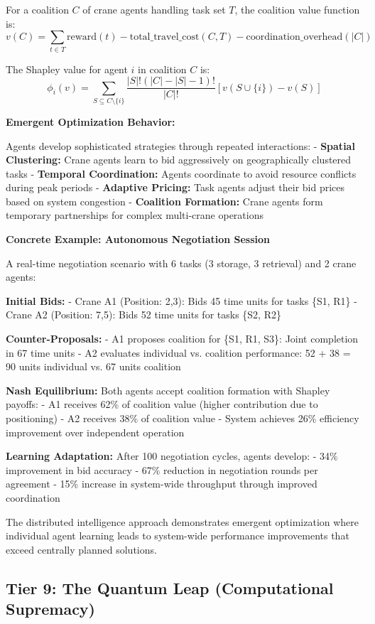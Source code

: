 \documentclass{article}
\begin{document}
For a coalition $C$ of crane agents handling task set $T$, the coalition value function is:
$$v(C) = \sum_{t \in T} \text{reward}(t) - \text{total\_travel\_cost}(C, T) - \text{coordination\_overhead}(|C|)$$

The Shapley value for agent $i$ in coalition $C$ is:
$$\phi_i(v) = \sum_{S \subseteq C \setminus \{i\}} \frac{|S|!(|C|-|S|-1)!}{|C|!} [v(S \cup \{i\}) - v(S)]$$

\textbf{Emergent Optimization Behavior:}

Agents develop sophisticated strategies through repeated interactions:
- \textbf{Spatial Clustering:} Crane agents learn to bid aggressively on geographically clustered tasks
- \textbf{Temporal Coordination:} Agents coordinate to avoid resource conflicts during peak periods  
- \textbf{Adaptive Pricing:} Task agents adjust their bid prices based on system congestion
- \textbf{Coalition Formation:} Crane agents form temporary partnerships for complex multi-crane operations

\textbf{Concrete Example: Autonomous Negotiation Session}

A real-time negotiation scenario with 6 tasks (3 storage, 3 retrieval) and 2 crane agents:

\textbf{Initial Bids:}
- Crane A1 (Position: 2,3): Bids 45 time units for tasks \{S1, R1\}
- Crane A2 (Position: 7,5): Bids 52 time units for tasks \{S2, R2\}

\textbf{Counter-Proposals:}
- A1 proposes coalition for \{S1, R1, S3\}: Joint completion in 67 time units
- A2 evaluates individual vs. coalition performance: 52 + 38 = 90 units individual vs. 67 units coalition

\textbf{Nash Equilibrium:} Both agents accept coalition formation with Shapley payoffs:
- A1 receives 62\% of coalition value (higher contribution due to positioning)
- A2 receives 38\% of coalition value
- System achieves 26\% efficiency improvement over independent operation

\textbf{Learning Adaptation:} After 100 negotiation cycles, agents develop:
- 34\% improvement in bid accuracy
- 67\% reduction in negotiation rounds per agreement
- 15\% increase in system-wide throughput through improved coordination

The distributed intelligence approach demonstrates emergent optimization where individual agent learning leads to system-wide performance improvements that exceed centrally planned solutions.

\subsection{Tier 9: The Quantum Leap (Computational Supremacy)}
\end{document}
